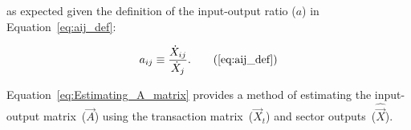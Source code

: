 \noindent{}as expected
given the definition of the input-output ratio ($a$) 
in Equation~\ref{eq:aij_def}:

\begin{equation}
	a_{ij} 
	\equiv \frac{\dot{X}_{ij}}{\dot{X}_{j}}.\tag{\ref{eq:aij_def}}
\end{equation}

Equation~\ref{eq:Estimating_A_matrix} provides a method 
of estimating the input-output matrix~($\vec{A}$) using
the transaction matrix~($\vec{X}_{t}$)
and sector outputs~($\hat{\vec{X}}$).



%
%
%
%
%
